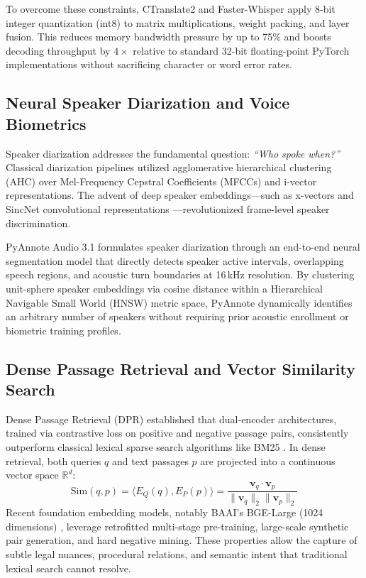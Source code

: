\documentclass{llncs}
\begin{document}
To overcome these constraints, CTranslate2 and Faster-Whisper \cite{fasterwhisper2023} apply 8-bit integer quantization (int8) to matrix multiplications, weight packing, and layer fusion. This reduces memory bandwidth pressure by up to 75\% and boosts decoding throughput by $4\times$ relative to standard 32-bit floating-point PyTorch implementations without sacrificing character or word error rates.

\subsection{Neural Speaker Diarization and Voice Biometrics}
Speaker diarization addresses the fundamental question: \textit{``Who spoke when?''} Classical diarization pipelines utilized agglomerative hierarchical clustering (AHC) over Mel-Frequency Cepstral Coefficients (MFCCs) and i-vector representations. The advent of deep speaker embeddings—such as x-vectors \cite{snyder2018xvector} and SincNet convolutional representations \cite{ravanelli2018sincnet}—revolutionized frame-level speaker discrimination.

PyAnnote Audio 3.1 \cite{bredin2023pyannote} formulates speaker diarization through an end-to-end neural segmentation model that directly detects speaker active intervals, overlapping speech regions, and acoustic turn boundaries at 16\,kHz resolution. By clustering unit-sphere speaker embeddings via cosine distance within a Hierarchical Navigable Small World (HNSW) metric space, PyAnnote dynamically identifies an arbitrary number of speakers without requiring prior acoustic enrollment or biometric training profiles.

\subsection{Dense Passage Retrieval and Vector Similarity Search}
Dense Passage Retrieval (DPR) \cite{karpukhin2020dpr} established that dual-encoder architectures, trained via contrastive loss on positive and negative passage pairs, consistently outperform classical lexical sparse search algorithms like BM25 \cite{robertson2009bm25}. In dense retrieval, both queries $q$ and text passages $p$ are projected into a continuous vector space $\mathbb{R}^d$:
\begin{equation}
\label{eq:dense_sim}
\text{Sim}(q, p) = \langle E_Q(q), E_P(p) \rangle = \frac{\mathbf{v}_q \cdot \mathbf{v}_p}{\|\mathbf{v}_q\|_2 \|\mathbf{v}_p\|_2}
\end{equation}
Recent foundation embedding models, notably BAAI's BGE-Large (1024 dimensions) \cite{baai2023bge}, leverage retrofitted multi-stage pre-training, large-scale synthetic pair generation, and hard negative mining. These properties allow the capture of subtle legal nuances, procedural relations, and semantic intent that traditional lexical search cannot resolve.
\end{document}
